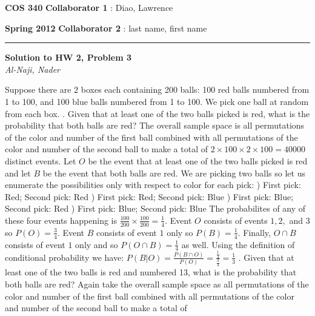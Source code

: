 \documentclass[12pt]{article}
\newcommand{\myheader}[4]
{\vspace*{-0.5in}
\noindent
{#1} \hfill {#3}

\noindent
{#2} \hfill {#4}

\noindent
\rule[8pt]{\textwidth}{1pt}

\vspace{1ex} 
}  %
\newcommand{\myalgsheader}[0]
{\myheader
{ {\bf{COS 340}} }
{ {\bf{Spring 2012}} }
{ {\bf{Collaborator 1}} : Diao, Lawrence }
{ {\bf{Collaborator 2}} : last name, first name}
}
\newcommand{\myhwtitle}[3]
{\begin{center}
{\large {\bf Solution to HW {#1}, Problem {#2}}}\\
\medskip 
{\it {#3}} %
\end{center}}
\begin{document}
\pagebreak
\myalgsheader
\pagestyle{plain}
\myhwtitle{2}{3}{Al-Naji, Nader}
\bigskip
Suppose there are $2$ boxes each containing 200 balls: 100 red balls numbered from 1 to 100,
and 100 blue balls numbered from 1 to 100. We pick one ball at random from each box. 
\newline
{}. Given that at least one of the two balls picked is red, what is the probability that both balls are red?
\newline
\newline
The overall sample space is all permutations of the color and number of the first ball combined
with all permutations of the color and number of the second ball to make a total of 
$2\times 100 \times 2 \times 100 = 40000$ distinct events.
\newline
\newline
Let $O$ be the event that at least one of the two balls picked is red and let $B$ be the event that
both balls are red. We are picking two balls so let us enumerate the possibilities only
with respect to color for each pick:
) First pick: Red; Second pick: Red
) First pick: Red;  Second pick: Blue
) First pick: Blue; Second pick: Red
) First pick: Blue; Second pick: Blue
\newline
\newline
The probabilites of any of these four events happening is $\frac{100}{200}\times \frac{100}{200} = \frac{1}{4}.$
Event $O$ consists of events $1, 2,$ and $3$ so $P(O) = \frac{3}{4}.$ Event $B$ consists of event $1$ only so
$P(B) = \frac{1}{4}$. Finally, $O \cap B$ consists of event $1$ only and so $P(O \cap B) = \frac{1}{4}$ as well.
Using the definition of conditional probability we have:
\newline
\newline
$P(B | O) = \frac{P(B \cap O)}{P(O)} = \frac{\frac{1}{4}}{\frac{3}{4}} = \frac{1}{3}$
\newline
{}. Given that at least one of the two balls is red and numbered 13, what is the probability that
both balls are red?
\newline
\newline
Again take the overall sample space as all permutations of the color and number of the first ball combined
with all permutations of the color and number of the second ball to make a total of 
\end{document}
